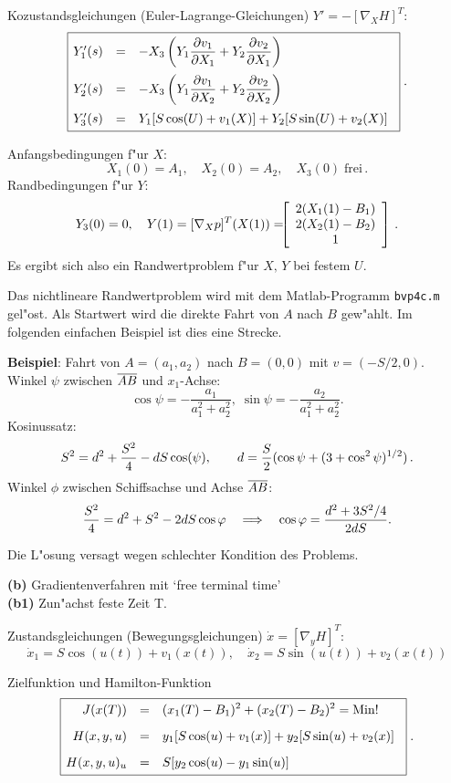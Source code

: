 \documentclass[12pt,a4paper,twoside,leqno]{article}
\begin{document}
Kozustandsgleichungen ({\sc Euler-Lagrange}-Gleichungen)
$Y' =  - [\nabla_X H]^T$:
\[
\fbox{$
\ba{.}{rcl}
Y'_1(s) &=& \dis
-X_3\left(Y_1\frac{\da v_1}{\da X_1} + Y_2\frac{\da v_2}{\da
X_1}\right)\\[4mm]
Y'_2(s) &=& \dis
- X_3\left(Y_1\frac{\da v_1}{\da X_2} + Y_2\frac{\da v_2}{\da
X_2}\right)\\[4mm] Y'_3(s) &=& \dis
Y_1[S\cos(U) + v_1(X)] + Y_2[S\sin(U) + v_2(X)]
\ea{.}
$}\; .
\]

Anfangsbedingungen f"ur $X$:
\[
X_1(0) = A_1, \quad X_2(0) = A_2, \quad X_3(0) \; \mbox{frei}\, .
\]
Randbedingungen f"ur $Y$:
\[
Y_3(0) = 0, \quad Y(1) = [\nabla_X p]^T(X(1))
= \ba{[}{c} 2(X_1(1) - B_1)\\ 2(X_2(1) - B_2)\\1\ea{]}\, .
\]
Es ergibt sich also ein Randwertproblem f"ur $X, \, Y$ bei festem $U$.

Das nichtlineare Randwertproblem wird mit dem {\sc Matlab}-Programm
\verb/bvp4c.m/ gel"ost.  Als Startwert wird die direkte Fahrt von $A$ nach $B$
gew"ahlt.  Im folgenden einfachen Beispiel ist dies eine Strecke.

{\bf Beispiel}: Fahrt  von $A = (a_1,a_2)$ nach $B = (0,0)$ mit $v = (- S/2,0)$.
Winkel $\psi$ zwischen $\ol{AB}$ und $x_1$-Achse:
\[
\cos \psi = - \frac{a_1}{a^2_1 + a^2_2}, \;
\sin \psi = - \frac{a_2}{a^2_1 + a^2_2}.
\]
Kosinussatz:
\[
S^2 =  d^2 + \frac{S^2}{4} - dS \cos(\psi), \qquad
d = \dis \frac{S}{2}(\cos \psi + (3 + \cos^2  \psi)^{1/2})\,.
\]
Winkel $\phi $ zwischen Schiffsachse und Achse $\ol{AB}$:
\[
\frac{S^2}{4} = d^2 + S^2 - 2dS \cos \phi
\quad \Longrightarrow \quad
\cos \phi  = \dis \frac{d^2 + 3S^2/4}{2dS}.
\]

Die L"osung versagt wegen schlechter Kondition des Problems.
\par
\vspace{1mm}
{\bf (b)} Gradientenverfahren mit `free terminal time'\\
{\bf (b1)} Zun"achst feste Zeit T.

Zustandsgleichungen (Bewegungsgleichungen) $\dot{x} = [\nabla_y H]^T$:
%
\[
\dot{x}_1 = S \cos(u(t)) + v_1(x(t)),\quad
\dot{x}_2 = S \sin(u(t)) + v_2(x(t))
\]

Zielfunktion und {\sc Hamilton}-Funktion
\[
\fbox{$
\ba{.}{rcl}
J(x(T)) &=& \dis (x_1(T) - B_1)^2 + (x_2(T) - B_2)^2 = \Min!\\[3mm]
H(x,y,u) &=& \dis
y_1[S\cos(u) + v_1(x)] + y_2[S\sin(u) + v_2(x)]\\[3mm]
H(x,y,u)_u &=& \dis
S[y_2\cos(u) - y_1\sin(u)]
\ea{.}
$}\; .
\]
\end{document}
